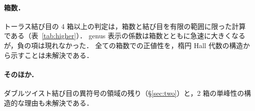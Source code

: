 \paragraph{箱数．}
トーラス結び目の 4 箱以上の判定は，箱数と結び目を有限の範囲に限った計算である（表~\ref{tab:higher}）．
genus 表示の係数は箱数とともに急速に大きくなるが，負の項は現れなかった．
全ての箱数での正値性を，楕円 Hall 代数の構造から示すことは未解決である．

\paragraph{そのほか．}
ダブルツイスト結び目の異符号の領域の残り（\S\ref{sec:two}）と，2 箱の単峰性の構造的な理由も未解決である．
